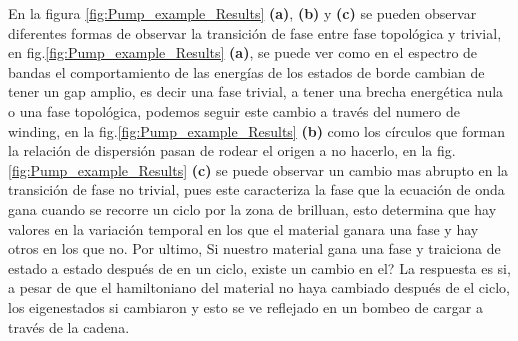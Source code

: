 En la figura \ref{fig:Pump_example_Results} \textbf{(a)}, \textbf{(b)} y \textbf{(c)} se pueden observar diferentes formas de observar la transición de fase entre fase topológica y trivial, en fig.\ref{fig:Pump_example_Results} \textbf{(a)}, se puede ver como en el espectro de bandas el comportamiento de las energías de los estados de borde cambian de tener un gap amplio, es decir una fase trivial, a tener una brecha energética nula o una fase topológica, podemos seguir este cambio a través del numero de winding, en la fig.\ref{fig:Pump_example_Results} \textbf{(b)} como los círculos que forman la relación de dispersión pasan de rodear el origen a no hacerlo, en la fig.\ref{fig:Pump_example_Results} \textbf{(c)} se puede observar un cambio mas abrupto en la transición de fase no trivial, pues este caracteriza la fase que la ecuación de onda gana cuando se recorre un ciclo por la zona de brilluan, esto determina que hay valores en la variación temporal en los que el material ganara una fase y hay otros en los que no. Por ultimo, Si nuestro material gana una fase y traiciona de estado a estado después de en un ciclo, existe un cambio en el? La respuesta es si, a pesar de que el hamiltoniano del material no haya cambiado después de el ciclo, los eigenestados si cambiaron y esto se ve reflejado en un bombeo de cargar a través de la cadena.

